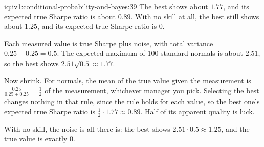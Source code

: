 \begin{solution}{iq:iv1:conditional-probability-and-bayes:39}
The best shows about $1.77$, and its expected true Sharpe ratio is about $0.89$. With no skill at all, the best still shows about $1.25$, and its expected true Sharpe ratio is 0.

Each measured value is true Sharpe plus noise, with total variance $0.25 + 0.25 = 0.5$. The expected maximum of 100 standard normals is about $2.51$, so the best shows $2.51\sqrt{0.5} \approx 1.77$.

Now shrink. For normals, the mean of the true value given the measurement is $\tfrac{0.25}{0.25 + 0.25} = \tfrac12$ of the measurement, whichever manager you pick. Selecting the best changes nothing in that rule, since the rule holds for each value, so the best one's expected true Sharpe ratio is $\tfrac12 \cdot 1.77 \approx 0.89$. Half of its apparent quality is luck.

With no skill, the noise is all there is: the best shows $2.51 \cdot 0.5 \approx 1.25$, and the true value is exactly 0.

\end{solution}

